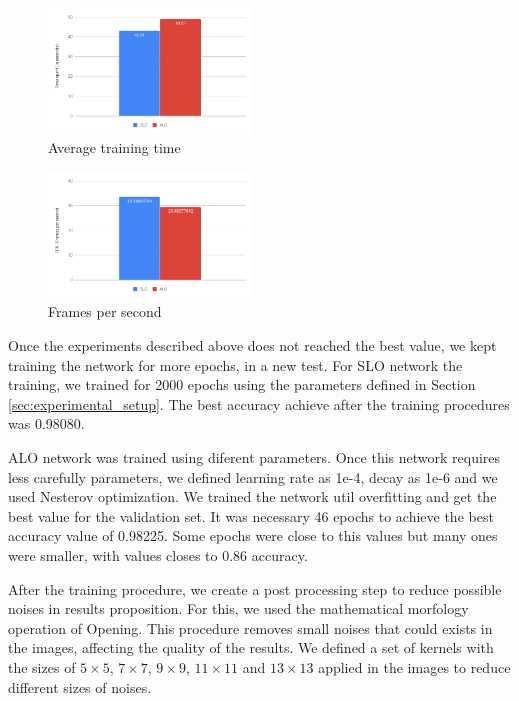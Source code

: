 \begin{figure}
  \centering
  \includegraphics[width=0.48\textwidth]{figures/train_time.png}
  \caption{Average training time}
  \label{fig:train_time}
\end{figure}

\begin{figure}
  \centering
  \includegraphics[width=0.48\textwidth]{figures/fps.png}
  \caption{Frames per second}
  \label{fig:fps}
\end{figure}

Once the experiments described above does not reached the best value, we kept training the network for more epochs, in a new test. For SLO network the training, we trained for 2000 epochs using the parameters defined in Section \ref{sec:experimental_setup}. The best accuracy achieve after the training procedures was 0.98080.

ALO network was trained using diferent parameters. Once this network requires less carefully parameters, we defined learning rate as 1e-4, decay as 1e-6 and we used Nesterov optimization. We trained the network util overfitting and get the best value for the validation set. It was necessary 46 epochs to achieve the best accuracy value of 0.98225. Some epochs were close to this values but many ones were smaller, with values closes to 0.86 accuracy.

After the training procedure, we create a post processing step to reduce possible noises in results proposition. For this, we used the mathematical morfology operation of Opening. This procedure removes small noises that could exists in the images, affecting the quality of the results. We defined a set of kernels with the sizes of $5 \times 5$, $7 \times 7$, $9 \times 9$, $11 \times 11$ and $13 \times 13$ applied in the images to reduce different sizes of noises.

